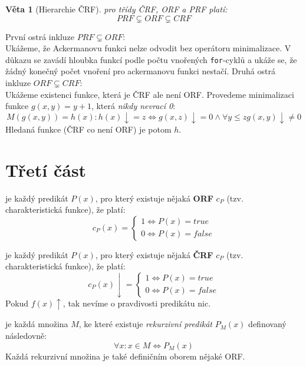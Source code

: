 \documentclass[a4paper]{article}      %
\newtheorem{theorem}{Věta}[section]
\newenvironment{proof}[1][Důkaz]{\begin{trivlist}
\item[\hskip \labelsep {\bfseries #1}]}{\end{trivlist}}
\newenvironment{definition}[1][Definice]{\begin{trivlist}
\item[\hskip \labelsep {\bfseries #1}]}{\end{trivlist}}
\begin{document}
\begin{theorem}[Hierarchie ČRF] pro třídy ČRF, ORF a PRF platí:
\[
PRF \subsetneq ORF \subsetneq CRF
\]
\end{theorem}

\begin{proof}
První ostrá inkluze $PRF \subsetneq ORF$:\\
Ukážeme, že Ackermanovu funkci nelze odvodit bez operátoru minimalizace.
V důkazu se zavádí hloubka funkcí podle počtu vnořených \verb+for+-cyklů a ukáže se,
že žádný konečný počet vnoření pro ackermanovu funkci nestačí.
Druhá ostrá inkluze $ORF \subsetneq CRF$:\\
Ukážeme existenci funkce, která je ČRF ale není ORF. Provedeme minimalizaci funkce $g(x,y)=y+1$, která \emph{nikdy nevrací 0}:
\[
M(g(x,y)) = h(x): h(x)\downarrow = z \Leftrightarrow g(x,z)\downarrow = 0 \wedge \forall y \leq z g(x,y)\downarrow \neq 0
\]
Hledaná funkce (ČRF co není ORF) je potom $h$.
\end{proof}

\section{Třetí část}

\begin{definition}[Rekurzivní predikát]
je každý predikát $P(x)$, pro který existuje nějaká \textbf{ORF} $c_{P}$ (tzv. charakteristická funkce), že platí:
\[
c_{P}(x)= \left\{
\begin{array}{l}
1 \Leftrightarrow P(x) = true\\
0 \Leftrightarrow P(x) = false
\end{array}
\right.
\]
\end{definition}

\begin{definition}[Rekurzivně spočetný predikát]
je každý predikát $P(x)$, pro který existuje nějaká \textbf{ČRF} $c_{P}$ (tzv. charakteristická funkce), že platí:
\[
c_{P}(x)\downarrow = \left\{
\begin{array}{l}
1 \Leftrightarrow P(x) = true\\
0 \Leftrightarrow P(x) = false
\end{array}
\right.
\]
Pokud $f(x)\uparrow$, tak nevíme o pravdivosti predikátu nic.
\end{definition}

\begin{definition}[Rekurzivní množina]
je každá množina $M$, ke které existuje \emph{rekurzivní predikát} $P_{M}(x)$ definovaný následovně:
\[
\forall x: x\in M \Leftrightarrow P_{M}(x)
\]
Každá rekurzivní množina je také definičním oborem nějaké ORF.
\end{definition}
\end{document}
